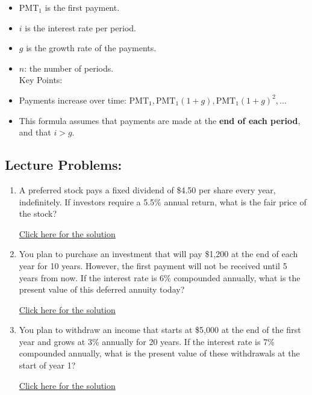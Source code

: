 \documentclass[
]{book}
\providecommand{\tightlist}{%
  \setlength{\itemsep}{0pt}\setlength{\parskip}{0pt}}
\begin{document}
\begin{enumerate}
  \begin{itemize}
  \tightlist
  \item
    \(\text{PMT}_1\) is the first payment.
  \item
    \(i\) is the interest rate per period.
  \item
    \(g\) is the growth rate of the payments.
  \item
    \(n\): the number of periods.\\
    Key Points:
  \item
    Payments increase over time: \(\text{PMT}_1, \text{PMT}_1(1+g), \text{PMT}_1(1+g)^2, \dots\)
  \item
    This formula assumes that payments are made at the \textbf{end of each period}, and that \(i > g\).
  \end{itemize}
\end{enumerate}

\subsection*{Lecture Problems:}\label{lecture-problems-17}

\begin{enumerate}
\def\labelenumi{\arabic{enumi}.}
\tightlist
\item
  A preferred stock pays a fixed dividend of \$4.50 per share every year, indefinitely. If investors require a 5.5\% annual return, what is the fair price of the stock?

  \href{https://youtu.be/DcH6X7vmuJI}{Click here for the solution}
\item
  You plan to purchase an investment that will pay \$1,200 at the end of each year for 10 years. However, the first payment will not be received until 5 years from now. If the interest rate is 6\% compounded annually, what is the present value of this deferred annuity today?

  \href{https://youtu.be/KKtTShNruXk}{Click here for the solution}
\item
  You plan to withdraw an income that starts at \$5,000 at the end of the first year and grows at 3\% annually for 20 years. If the interest rate is 7\% compounded annually, what is the present value of these withdrawals at the start of year 1?

  \href{https://youtu.be/MgdL-JOsw38}{Click here for the solution}
\end{enumerate}
\end{document}
